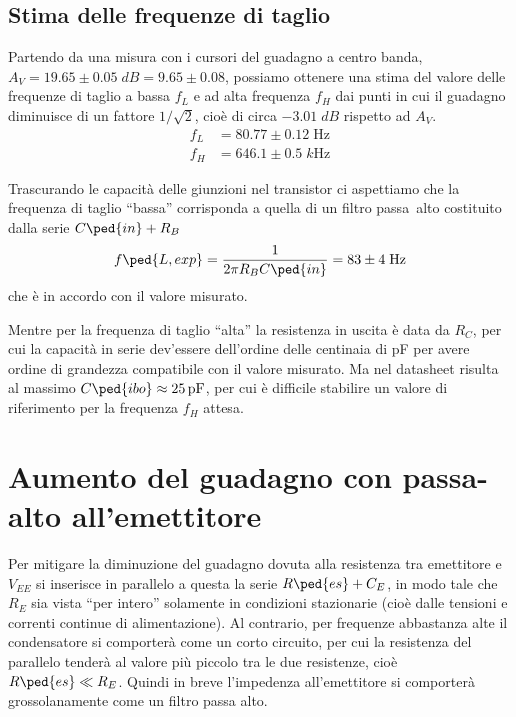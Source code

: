 \documentclass[10pt,a4paper]{article}
\begin{document}
\subsection{Stima delle frequenze di taglio}
Partendo da una misura con i cursori del guadagno a centro banda,
$A_V = 19.65 \pm 0.05 \; \si{dB} = 9.65 \pm 0.08$, possiamo ottenere una stima del valore
delle frequenze di taglio a bassa $f_L$ e ad alta frequenza $f_H$ dai punti
in cui il guadagno diminuisce di un fattore $1/\sqrt{2}$, cioè di circa
$-3.01 \; \si{dB}$ rispetto ad $A_V$.
\begin{align*}
f_L &= 80.77 \pm 0.12 \; \si{\Hz}\\
f_H &= 646.1 \pm 0.5 \; \si{k\Hz}
\end{align*}

Trascurando le capacità delle giunzioni nel transistor ci aspettiamo che
la frequenza di taglio ``bassa'' corrisponda a quella di un filtro passa~alto
costituito dalla serie $C\ped{in} + R_B$
\begin{equation}
f\ped{L, exp} = \frac{1}{2\pi R_B C\ped{in}} = 83 \pm 4 \; \si{\Hz}
\end{equation} 
che è in accordo con il valore misurato.

Mentre per la frequenza di taglio ``alta'' la resistenza in uscita è data
da $R_C$, per cui la capacità in serie dev'essere dell'ordine delle centinaia
di pF per avere ordine di grandezza compatibile con il valore misurato.
Ma nel datasheet risulta al massimo $C\ped{ibo} \approx \SI{25}{p\F}$, per cui
è difficile stabilire un valore di riferimento per la frequenza $f_H$ attesa.

\section{Aumento del guadagno con passa-alto all'emettitore}
Per mitigare la diminuzione del guadagno dovuta alla resistenza tra emettitore
e $V_{EE}$ si inserisce in parallelo a questa la serie $R\ped{es} + C_E$,
in modo tale che $R_E$ sia vista ``per intero'' solamente in condizioni
stazionarie (cioè dalle tensioni e correnti continue di alimentazione).
Al contrario, per frequenze abbastanza alte il condensatore si comporterà come
un corto circuito, per cui la resistenza del parallelo tenderà al valore più
piccolo tra le due resistenze, cioè $R\ped{es} \ll R_E$.
Quindi in breve l'impedenza all'emettitore si comporterà grossolanamente
come un filtro passa alto.
\end{document}

